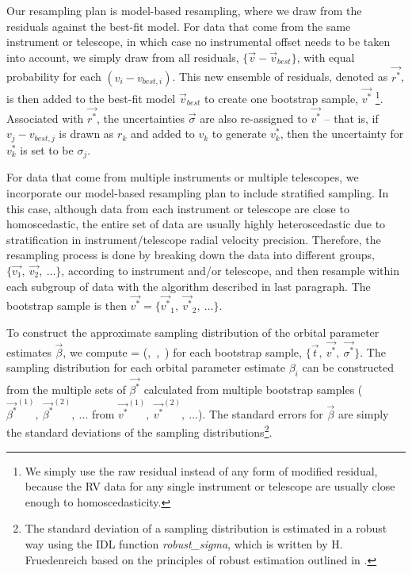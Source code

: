 Our resampling plan is model-based resampling, where we draw from the
residuals against the best-fit model. For data that come from the
same instrument or telescope, in which case no instrumental offset
needs to be taken into account, we simply draw from all residuals,
$\lbrace \vec{v}-\vec{v}_{best} \rbrace$, with equal probability for
each $(v_i - v_{best,i})$. This new ensemble of residuals, denoted as
${\vec{r^*}}$, is then added to the best-fit model $\vec{v}_{best}$ to
create one bootstrap sample, $\vec{v^*}$ \footnote{We simply use the
  raw residual instead of any form of modified residual, because the
  RV data for any single instrument or telescope are usually close
  enough to homoscedasticity.}. Associated with ${\vec{r^*}}$, the
uncertainties $\vec{\sigma}$ are also re-assigned to $\vec{v^*}$ --
that is, if $v_j - v_{best,j}$ is drawn as $r_k$ and added to $v_k$ to
generate $v^*_k$, then the uncertainty for $v^*_k$ is set to be
$\sigma_j$.

For data that come from multiple instruments or multiple
telescopes, we incorporate our model-based resampling plan to include
stratified sampling. In this case, although data from each instrument
or telescope are close to homoscedastic, the entire set of data are
usually highly heteroscedastic due to stratification in
instrument/telescope radial velocity precision. Therefore, the
resampling process is done by breaking down the data into different
groups, $\lbrace \vec{v_1},\ \vec{v_2},\ \ldots \rbrace$, according to
instrument and/or telescope, and then resample within each
subgroup of data with the algorithm described in last paragraph. The bootstrap
sample is then $\vec{v^*} = \lbrace \vec{v^*}_1,\ \vec{v^*}_2,\ \ldots
\rbrace$.

To construct the approximate sampling distribution of the orbital
parameter estimates $\vec{\beta}$, we compute \beq \vec{\beta^*} =
\mu(,\ ,\ \vec{\sigma^*}) \eeq for each bootstrap
sample, $\lbrace \vec{t},\ \vec{v^*},\ \vec{\sigma^*} \rbrace$. The
sampling distribution for each orbital parameter estimate $\beta_i$
can be constructed from the multiple sets of $\vec{\beta^*}$
calculated from multiple bootstrap samples
($\vec{\beta^*}^{(1)},\ \vec{\beta^*}^{(2)},\ \ldots$ from
$\vec{v^*}^{(1)},\ \vec{v^*}^{(2)},\ \ldots$). The standard errors for
$\vec{\beta}$ are simply the standard deviations of the sampling
distributions\footnote{The standard deviation of a sampling
  distribution is estimated in a robust way using the IDL function
  {\it robust\_sigma}, which is written by H. Fruedenreich based on
  the principles of robust estimation outlined in \cite{1983ured.book.....H}.}.

